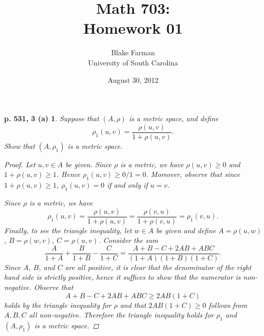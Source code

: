 \documentclass[10pt]{amsart}
\author{Blake Farman\\University of South Carolina}
\title{Math 703:\\Homework 01}
\date{August 30, 2012}
\begin{document}
\maketitle

\providecommand{\norm}[1]{\lVert#1\rVert}
\renewcommand{\qedsymbol}{\ensuremath{\blacksquare}}
\newcommand{\abs}[1]{\left| #1 \right|}

\newtheorem*{ex3a}{p. 531, 3 (a)}
\newtheorem*{ex4}{p. 531, 4}
\newtheorem*{ex13}{p. 532, 13}
\newtheorem*{ex25}{p. 535, 25}

\begin{ex3a}
  Suppose that $(A,\rho)$ is a metric space, and define 
  $$\rho_1(u,v) = \frac{\rho(u,v)}{1 + \rho(u,v)}.$$
  Show that $(A, \rho_1)$ is a metric space.
  
  \begin{proof}
    Let $u,v \in A$ be given.
    Since $\rho$ is a metric, we have $\rho(u,v) \geq 0$ and $1 + \rho(u,v) \geq 1$.
    Hence $\rho_1(u,v) \geq 0 / 1 = 0$.
    Moreover, observe that since $1 + \rho(u,v) \geq 1$, $\rho_1(u,v) = 0$ if and only if $u = v$.
    
    Since $\rho$ is a metric, we have
    $$\rho_1(u,v) = \frac{\rho(u,v)}{1 + \rho(u,v)} = \frac{\rho(v,u)}{1 + \rho(v,u)} = \rho_1(v,u).$$
    Finally, to see the triangle inequality, let $w \in A$ be given and define $A = \rho(u,w)$, $B = \rho(w,v)$, $C = \rho(u,v)$.
    Consider the sum
    $$ \frac{A}{1+A} + \frac{B}{1 + B} - \frac{C}{1+C} = \frac{A + B - C + 2AB + ABC}{(1+A)(1+B)(1+C)}.$$
    Since $A$, $B$, and $C$ are all positive, it is clear that the denominator of the right hand side is strictly positive, hence it suffices to show that the numerator is non-negative.
    Observe that $$A + B - C + 2AB + ABC \geq 2AB(1 + C)$$ holds by the triangle inequality for $\rho$ and that $2AB(1+C) \geq 0$ follows from $A,B,C$ all non-negative.
    Therefore the triangle inequality holds for $\rho_1$ and $(A,\rho_1)$ is a metric space.
  \end{proof}
\end{ex3a}
\end{document}
